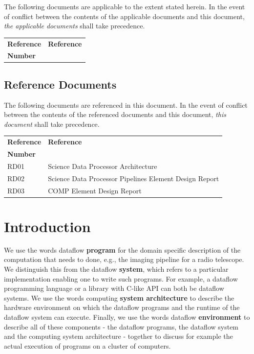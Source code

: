 \documentclass[11pt,a4paper]{article}
\begin{document}
The following documents are applicable to the extent stated herein. In the
event of conflict between the contents of the applicable documents and this
document, \emph{the applicable documents} shall take precedence.

\begin{center}{
\begin{tabularx}{\textwidth}{|X|X|}
    \hline
    \bf{Reference} & \bf{Reference}\\
    \bf{Number} & \\
    \hline
\end{tabularx}}
\end{center}

\subsection*{Reference Documents}

The following documents are referenced in this document. In the event of
conflict between the contents of the referenced documents and this document,
\emph{this document} shall take precedence.

\begin{center}{
\begin{tabularx}{\textwidth}{|X|X|}
    \hline
    \bf{Reference} & \bf{Reference}\\
    \bf{Number} & \\
    \hline
    RD01 & Science Data Processor Architecture\\\hline
    RD02 & Science Data Processor Pipelines Element Design Report\\\hline
    RD03 & COMP Element Design Report\\\hline
  \end{tabularx}}
\end{center}



\newpage
\section{Introduction}

We use the words dataflow {\bf program} for the domain specific
description of the computation that needs to done, e.g., the imaging
pipeline for a radio telescope.  We distinguish this from the dataflow
{\bf system}, which refers to a particular implementation enabling one
to write such programs. For example, a dataflow programming language
or a library with C-like API can both be dataflow systems.  We use the
words computing {\bf system architecture} to describe the hardware
environment on which the dataflow programs and the runtime of the
dataflow system can execute.  Finally, we use the words dataflow {\bf
  environment} to describe all of these components - the dataflow
programs, the dataflow system and the computing system architecture -
together to discuss for example the actual execution of programs on a
cluster of computers.
\end{document}
